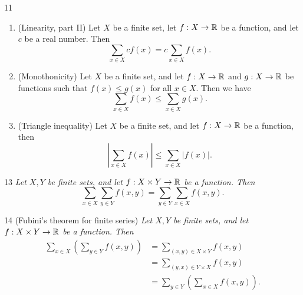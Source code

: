 \begin{proposition}{11}
{\begin{enumerate}
\begin{equation*}
            \sum_{x \in X} (f(x) + g(x)) = \sum_{x \in X} f(x) + \sum_{x \in X} g(x).
        \end{equation*}
        \item (Linearity, part II) Let $X$ be a finite set, let $f: X \rightarrow \mathbb{R}$
        be a function, and let $c$ be a real number. Then
        \begin{equation*}
            \sum_{x \in X} cf(x) = c \sum_{x \in X} f(x).
        \end{equation*}
        \item (Monothonicity) Let $X$ be a finite set, and let $f: X \rightarrow \mathbb{R}$
        and $g: X \rightarrow \mathbb{R}$ be functions such that $f(x) \leq g(x)$ for all
        $x \in X$. Then we have
        \begin{equation*}
            \sum_{x \in X} f(x) \leq \sum_{x \in X} g(x).
        \end{equation*}
        \item (Triangle inequality) Let $X$ be a finite set, and let $f: X \rightarrow \mathbb{R}$
        be a function, then
        \begin{equation*}
            |\sum_{x \in X} f(x)| \leq \sum_{x \in X} |f(x)|.
        \end{equation*}
    \end{enumerate}}
\end{proposition}

\begin{lemma}{13}
    \label{finite-sum-product}
    \emph{Let $X, Y$ be finite sets, and let $f: X \times Y \rightarrow \mathbb{R}$
    be a function. Then
    \begin{equation*}
        \sum_{x \in X} \sum_{y \in Y} f(x, y) = \sum_{y \in Y} \sum_{x \in X} f(x, y).
    \end{equation*}}
\end{lemma}

\begin{corollary}{14}
    \label{fubini-finite}
    (Fubini's theorem for finite series) \emph{Let $X, Y$ be finite sets, and let
    $f: X \times Y \rightarrow \mathbb{R}$ be a function. Then
    \begin{align*}
        \sum_{x \in X} (\sum_{y \in Y} f(x, y)) &= \sum_{(x, y) \in X \times Y} f(x, y) \\
        &= \sum_{(y, x) \in Y \times X} f(x, y) \\
        &= \sum_{y \in Y} (\sum_{x \in X} f(x, y)).
    \end{align*}}
\end{corollary}

